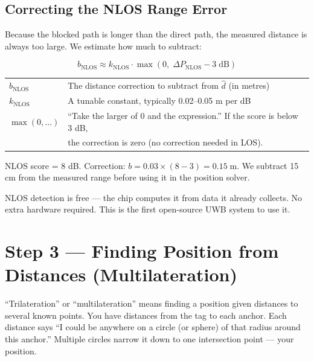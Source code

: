 \documentclass[11pt,a4paper]{article}
\begin{document}
\subsection{Correcting the NLOS Range Error}

Because the blocked path is longer than the direct path, the measured distance is always too large. We estimate how much to subtract:

\begin{equation}
b_{\text{NLOS}} \approx k_{\text{NLOS}} \cdot \max(0,\; \Delta P_{\text{NLOS}} - 3\;\text{dB})
\label{eq:biasnlos}
\end{equation}

\begin{symbols}
\begin{tabular}{ll}
$b_{\text{NLOS}}$ & The distance correction to subtract from $\hat{d}$ (in metres) \\
$k_{\text{NLOS}}$ & A tunable constant, typically 0.02--0.05 m per dB \\
$\max(0, \ldots)$ & ``Take the larger of 0 and the expression.'' If the score is below 3 dB, \\
                  & the correction is zero (no correction needed in LOS). \\
\end{tabular}
\end{symbols}

\begin{worked}[Example]
NLOS score = 8 dB. Correction: $b = 0.03 \times (8-3) = 0.15\;\text{m}$. We subtract 15 cm from the measured range before using it in the position solver.
\end{worked}

\begin{takeaway}
NLOS detection is free --- the chip computes it from data it already collects. No extra hardware required. This is the first open-source UWB system to use it.
\end{takeaway}

\section{Step 3 --- Finding Position from Distances (Multilateration)}
\label{sec:multilat}

\begin{plain}
``Trilateration'' or ``multilateration'' means finding a position given distances to several known points. You have distances from the tag to each anchor. Each distance says ``I could be anywhere on a circle (or sphere) of that radius around this anchor.'' Multiple circles narrow it down to one intersection point --- your position.
\end{plain}
\end{document}
